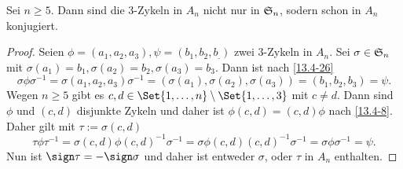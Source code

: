 \begin{lem} \label{20.5-5}
	Sei $n \ge 5$.
	Dann sind die $3$-Zykeln in $A_n$ nicht nur in $\S_n$, sodern schon in $A_n$ konjugiert.
	\begin{proof}
		Seien $\phi = (a_1, a_2, a_3), \psi = (b_1, b_2, b_.)$ zwei $3$-Zykeln in $A_n$.
		Sei $\sigma \in \S_n$ mit $\sigma(a_1) = b_1, \sigma(a_2) = b_2, \sigma(a_3) = b_3$.
		Dann ist nach \ref{13.4-26}
		\[
			\sigma \phi \sigma^{-1} = \sigma (a_1, a_2, a_3) \sigma^{-1} = (\sigma(a_1), \sigma(a_2), \sigma(a_3)) = (b_1, b_2, b_3) = \psi.
		\]
		Wegen $n \ge 5$ gibt es $c, d \in \Set{1, \dotsc, n} \setminus \Set{1, \dotsc, 3}$ mit $c \neq d$.
		Dann sind $\phi$ und $(c,d)$ disjunkte Zykeln und daher ist $\phi (c,d) = (c,d) \phi$ nach \ref{13.4-8}.
		Daher gilt mit $\tau := \sigma (c,d)$
		\[
			\tau \phi \tau^{-1}
			= \sigma (c,d) \phi (c,d)^{-1} \sigma^{-1}
			= \sigma \phi (c,d)(c,d)^{-1} \sigma^{-1}
			= \sigma \phi \sigma^{-1}
			= \psi.
		\]
		Nun ist $\sign \tau = - \sign \sigma$ und daher ist entweder $\sigma$, oder $\tau$ in $A_n$ enthalten.
	\end{proof}
\end{lem}

